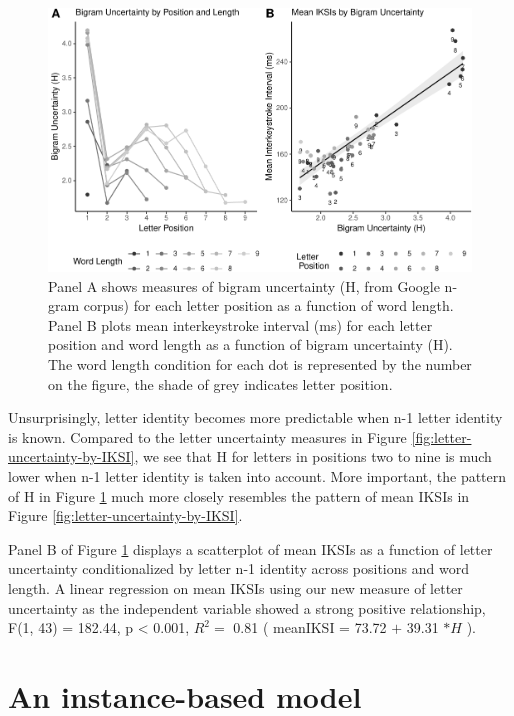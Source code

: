 \documentclass[floatsintext,man]{apa6}
\theoremstyle{definition}
\theoremstyle{definition}
\theoremstyle{definition}
\theoremstyle{remark}
\begin{document}
\begin{figure}[htbp]
\centering
\includegraphics{Entropy_typing_draft_files/figure-latex/letter-uncertainty-bigram-1.pdf}
\caption{\label{fig:letter-uncertainty-bigram}Panel A shows measures of bigram
uncertainty (H, from Google n-gram corpus) for each letter position as a
function of word length. Panel B plots mean interkeystroke interval (ms)
for each letter position and word length as a function of bigram
uncertainty (H). The word length condition for each dot is represented
by the number on the figure, the shade of grey indicates letter
position.}
\end{figure}

Unsurprisingly, letter identity becomes more predictable when n-1 letter
identity is known. Compared to the letter uncertainty measures in Figure
\ref{fig:letter-uncertainty-by-IKSI}, we see that H for letters in
positions two to nine is much lower when n-1 letter identity is taken
into account. More important, the pattern of H in Figure
\ref{fig:letter-uncertainty-bigram} much more closely resembles the
pattern of mean IKSIs in Figure \ref{fig:letter-uncertainty-by-IKSI}.

Panel B of Figure \ref{fig:letter-uncertainty-bigram} displays a
scatterplot of mean IKSIs as a function of letter uncertainty
conditionalized by letter n-1 identity across positions and word length.
A linear regression on mean IKSIs using our new measure of letter
uncertainty as the independent variable showed a strong positive
relationship, F(1, 43) = 182.44, p \textless{} 0.001, \(R^2 =\) 0.81 (
meanIKSI = 73.72 \(+\) 39.31 \(* H\) ).

\section{An instance-based model}\label{an-instance-based-model}
\end{document}
